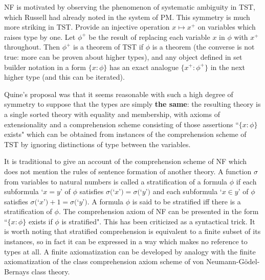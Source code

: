 \documentclass{slides}
\begin{document}
\begin{slide}

NF is motivated by observing the phenomenon of systematic ambiguity in TST, which Russell had already noted in the system of PM.  This symmetry is much more striking in TST.
Provide an injective operation $x \mapsto x^+$ on variables which raises type by one.  Let $\phi^+$ be the result of replacing each variable $x$ in $\phi$ with $x^+$ throughout.  Then $\phi^+$ is a theorem of TST if $\phi$ is a theorem (the converse is not true:  more can be proven about higher types), and any object defined in set builder notation in a form $\{x : \phi\}$ has an exact analogue
$\{x^+:\phi^+\}$ in the next higher type (and this can be iterated).

\end{slide}

\begin{slide}

Quine's proposal was that it seems reasonable with such a high degree of symmetry to suppose that the types are simply {\bf the same}:  the resulting theory is a single sorted theory with equality and membership, with axioms of extensionality and a comprehension scheme consisting of those assertions ``$\{x:\phi\}$ exists" which can be obtained from instances of the comprehension scheme of TST by ignoring distinctions of type between the variables.


\end{slide}

\begin{slide}

It is traditional to give an account of the comprehension scheme of NF which does not mention the rules of sentence formation of another theory.  A function $\sigma$ from variables to natural numbers is called a stratification of a formula $\phi$ if each subformula `$x=y$' of $\phi$ satisfies $\sigma($`$x$'$)=\sigma($`$y$'$)$  and each subformula `$x\in y$' of $\phi$ satisfies $\sigma($`$x$'$)+1=\sigma($`$y$'$)$.  A formula $\phi$ is said to be stratified iff there is a stratification of $\phi$.  The comprehension axiom of NF can be presented in the form ``$\{x:\phi\}$ exists if $\phi$ is stratified".  This has been criticized as a syntactical trick.  It is worth noting that stratified comprehension is equivalent to a finite subset of its instances, so in fact it can be expressed in a way which makes no reference to types at all.  A finite axiomatization can be developed by analogy with the finite axiomatization of the class comprehension axiom scheme of von Neumann-G\"odel-Bernays class theory.

\end{slide}
\end{document}
